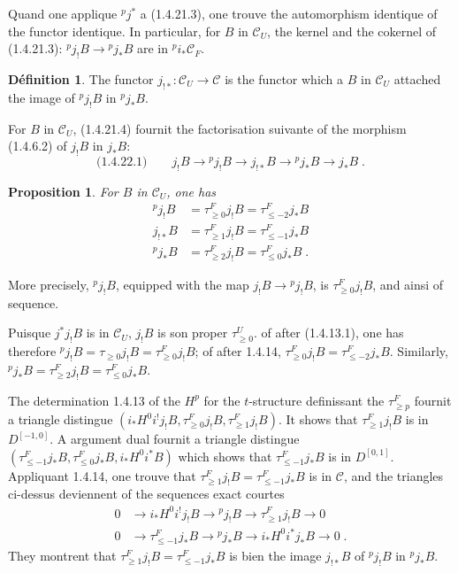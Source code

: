 \documentclass[12pt,a4paper]{article}
\theoremstyle{plain}
\newtheorem{proposition}[theorem]{Proposition}
\theoremstyle{definition}
\newtheorem{definition}[theorem]{D\'efinition}
\begin{document}
Quand one applique ${}^p j^*$ a (1.4.21.3), one trouve the automorphism identique of the functor identique. In particular, for $B$ in $\mathcal{C}_U$, the kernel and the cokernel of (1.4.21.3): ${}^p j_! B \to {}^p j_* B$ are in ${}^p i_* \mathcal{C}_F$.

\begin{definition}\label{def:1.4.22}
The functor $j_{!*} : \mathcal{C}_U \to \mathcal{C}$ is the functor which a $B$ in $\mathcal{C}_U$ attached the image of ${}^p j_! B$ in ${}^p j_* B$.
\end{definition}

For $B$ in $\mathcal{C}_U$, (1.4.21.4) fournit the factorisation suivante of the morphism (1.4.6.2) of $j_! B$ in $j_* B$:
\[
\text{(1.4.22.1)}\qquad j_! B \longrightarrow {}^p j_! B \longrightarrow j_{!*} B \longrightarrow {}^p j_* B \longrightarrow j_* B\;.
\]

\begin{proposition}\label{prop:1.4.23}
For $B$ in $\mathcal{C}_U$, one has
\begin{align*}
{}^p j_! B &= \tau_{\geqslant 0}^F j_! B = \tau_{\leqslant -2}^F j_* B\\
j_{!*} B &= \tau_{\geqslant 1}^F j_! B = \tau_{\leqslant -1}^F j_* B\\
{}^p j_* B &= \tau_{\geqslant 2}^F j_! B = \tau_{\leqslant 0}^F j_* B\;.
\end{align*}
\end{proposition}

More precisely, ${}^p j_! B$, equipped with the map $j_! B \to {}^p j_! B$, is $\tau_{\geqslant 0}^F j_! B$, and ainsi of sequence.

Puisque $j^* j_! B$ is in $\mathcal{C}_U$, $j_! B$ is son proper $\tau_{\geqslant 0}^U$. of after (1.4.13.1), one has therefore ${}^p j_! B = \tau_{\geqslant 0} j_! B = \tau_{\geqslant 0}^F j_! B$; of after 1.4.14, $\tau_{\geqslant 0}^F j_! B = \tau_{\leqslant -2}^F j_* B$. Similarly, ${}^p j_* B = \tau_{\geqslant 2}^F j_! B = \tau_{\leqslant 0}^F j_* B$.

The determination 1.4.13 of the $H^p$ for the $t$-structure definissant the $\tau_{\geqslant p}^F$ fournit a triangle distingue $(i_* H^0 i^! j_! B, \tau_{\geqslant 0}^F j_! B, \tau_{\geqslant 1}^F j_! B)$. It shows that $\tau_{\geqslant 1}^F j_! B$ is in $D^{[-1,0]}$. A argument dual fournit a triangle distingue $(\tau_{\leqslant -1}^F j_* B, \tau_{\leqslant 0}^F j_* B, i_* H^0 i^* B)$ which shows that $\tau_{\leqslant -1}^F j_* B$ is in $D^{[0,1]}$. Appliquant 1.4.14, one trouve that $\tau_{\geqslant 1}^F j_! B = \tau_{\leqslant -1}^F j_* B$ is in $\mathcal{C}$, and the triangles ci-dessus deviennent of the sequences exact courtes
\begin{align*}
0 &\longrightarrow i_* H^0 i^! j_! B \longrightarrow {}^p j_! B \longrightarrow \tau_{\geqslant 1}^F j_! B \longrightarrow 0\\
0 &\longrightarrow \tau_{\leqslant -1}^F j_* B \longrightarrow {}^p j_* B \longrightarrow i_* H^0 i^* j_* B \longrightarrow 0\;.
\end{align*}
They montrent that $\tau_{\geqslant 1}^F j_! B = \tau_{\leqslant -1}^F j_* B$ is bien the image $j_{!*} B$ of ${}^p j_! B$ in ${}^p j_* B$.
\end{document}
